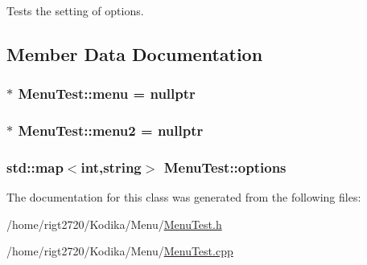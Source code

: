 Tests the setting of options. 



\subsection{Member Data Documentation}
\hypertarget{classMenuTest_a1112471b20626234fa45958cce6ed8d5}{
\subsubsection[{menu}]{$\ast$ Menu\-Test\-::menu = nullptr\hspace{0.3cm}{\ttfamily [private]}}}\label{classMenuTest_a1112471b20626234fa45958cce6ed8d5}
\hypertarget{classMenuTest_a9d994a71bc3d2d182f63030492aeb84d}{
\subsubsection[{menu2}]{$\ast$ Menu\-Test\-::menu2 = nullptr\hspace{0.3cm}{\ttfamily [private]}}}\label{classMenuTest_a9d994a71bc3d2d182f63030492aeb84d}
\hypertarget{classMenuTest_a49607805fcfaf8b080037d0a2b377e74}{
\subsubsection[{options}]{\setlength{\rightskip}{0pt plus 5cm}std\-::map$<$int,string$>$ Menu\-Test\-::options\hspace{0.3cm}{\ttfamily [private]}}}\label{classMenuTest_a49607805fcfaf8b080037d0a2b377e74}


The documentation for this class was generated from the following files\-:\begin{DoxyCompactItemize}
\item 
/home/rigt2720/\-Kodika/\-Menu/\hyperlink{MenuTest_8h}{Menu\-Test.\-h}\item 
/home/rigt2720/\-Kodika/\-Menu/\hyperlink{MenuTest_8cpp}{Menu\-Test.\-cpp}\end{DoxyCompactItemize}
